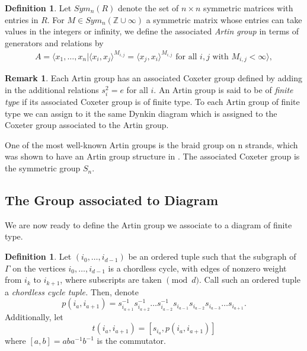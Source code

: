\documentclass[11pt]{amsart}
\theoremstyle{definition}
\newtheorem{defn}[thm]{Definition}
\newtheorem{rem}[thm]{Remark}
\begin{document}
\begin{defn}
\cite[Beginning of section 1.2]{C06}
Let $Sym_n(R)$ denote the set of $n \times n$ symmetric matrices with entries in $R$. For $M \in Sym_n(\mathbb Z \cup \infty)$ a symmetric matrix whose entries can take values in the integers or infinity, we define the associated {\it Artin group} in terms of generators and relations by
\begin{align*}
A = \langle x_1,\ldots, x_n| \langle x_i,x_j \rangle^{M_{i,j}} = \langle x_j,x_i \rangle^{M_{i,j}} \text{ for all } i,j \text{ with } M_{i,j}<\infty \rangle,
\end{align*}
\end{defn}

\begin{rem}
Each Artin group has an associated Coxeter group defined by adding in the additional relations $s_i^2 = e$ for all $i.$ An Artin group is said to be of {\it finite type} if its associated Coxeter group is of finite type. To each Artin group of finite type we can assign to it the same Dynkin diagram which is assigned to the Coxeter group associated to the Artin group.
\end{rem}

One of the most well-known Artin groups is the braid group on n strands, which was shown to have an Artin group structure in \cite{FN61}. The associated Coxeter group is the symmetric group $S_{n}$.

\subsection{The Group associated to Diagram}

We are now ready to define the Artin group we associate to a diagram of finite type.

\begin{defn}
\label{defn:cycle_tuple}
Let $(i_0,\ldots, i_{d-1})$ be an ordered tuple such that the subgraph of $\Gamma$ on the vertices $i_0,\ldots, i_{d-1}$ is a chordless cycle, with edges of nonzero weight from $i_k$ to $i_{k+1}$, where subscripts are taken $\pmod d.$ Call such an ordered tuple a {\it chordless cycle tuple.} Then, denote $$p(i_a,i_{a+1}) = s_{i_{a+1}}^{-1}s_{i_{a+2}}^{-1}\dots s_{i_{a-2}}^{-1}s_{i_{a-1}}s_{i_{a-2}}s_{i_{a-3}}\dots s_{i_{a+1}}.$$ Additionally, let $$t(i_a,i_{a+1}) = [s_{i_a},p(i_a,i_{a+1})]$$ where $[a,b] = aba^{-1}b^{-1}$ is the commutator.
\end{defn}
\end{document}

